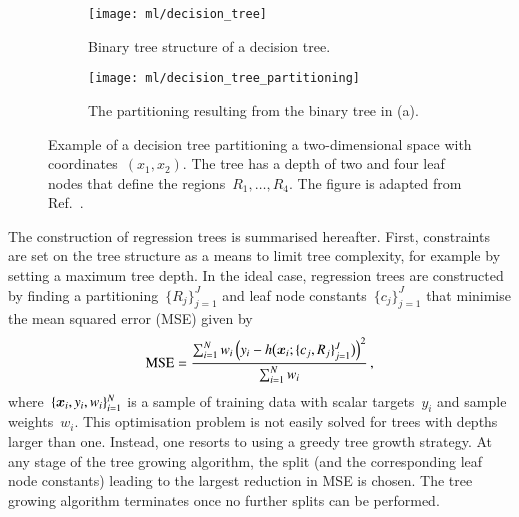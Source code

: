 
\begin{figure}[htbp]
  \centering

  \begin{subfigure}[b]{0.46\textwidth}
    \centering
    \texttt{[image: ml/decision\_tree]}
    \caption{Binary tree structure of a decision tree.}
  \end{subfigure}\hfill%
  \begin{subfigure}[b]{0.46\textwidth}
    \centering
    \texttt{[image: ml/decision\_tree\_partitioning]}
    \vspace*{0.7em}
    \caption{The partitioning resulting from the binary tree in (a).}
  \end{subfigure}\hfill%

  \caption{Example of a decision tree partitioning a two-dimensional space with
    coordinates~$(x_1, x_2)$. The tree has a depth of two and four leaf nodes
    that define the regions~$R_1, \dots, R_4$. The figure is adapted from
    Ref.~\cite{hastie09}.}%
  \label{fig:decision_tree}
\end{figure}

The construction of regression trees is summarised hereafter. First, constraints
are set on the tree structure as a means to limit tree complexity, for example
by setting a maximum tree depth.
In the ideal case, regression trees are constructed by finding a
partitioning~$\{R_j\}_{j=1}^{J}$ and leaf node constants~$\{c_j\}_{j=1}^{J}$
that minimise the mean squared error (MSE) given by
\begin{align*}
  \text{MSE} = \frac{\sum_{i = 1}^{N} w_i \left( y_i - h\bigl( \bm{x}_i; \{c_j, R_j\}_{j=1}^{J} \bigr) \right)^2}{\sum_{i = 1}^{N} w_i} \,\text{,}
\end{align*}
where~$\{\bm{x}_i, y_i, w_i\}_{i=1}^{N}$ is a sample of training data with
scalar targets~$y_i$ and sample weights~$w_i$. This optimisation problem is not
easily solved for trees with depths larger than one. Instead, one resorts to
using a greedy tree growth strategy. At any stage of the tree growing algorithm,
the split (and the corresponding leaf node constants) leading to the largest
reduction in MSE is chosen. The tree growing algorithm terminates once no
further splits can be performed.

